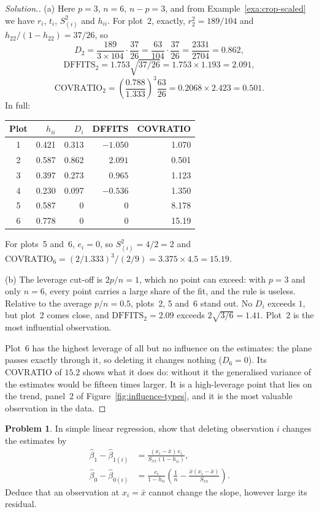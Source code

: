 \documentclass[11pt,a4paper]{article}
\numberwithin{equation}{section}
\theoremstyle{definition}
\newtheorem{problemx}{Problem}[subsection]
\newenvironment{problem}{\begin{problemx}}{\end{problemx}}
\newenvironment{solution}
  {\renewcommand{\qedsymbol}{}\begin{proof}[\textit{Solution}.]}
  {\end{proof}}
\begin{document}
\begin{solution}
(a) Here $p = 3$, $n = 6$, $n - p = 3$, and from Example~\ref{exa:crop-scaled} we have $r_i$, $t_i$,
$S^2_{(i)}$ and $h_{ii}$. For plot~2, exactly, $r_2^2 = 189/104$ and $h_{22}/(1 - h_{22}) = 37/26$, so
\[
D_2 = \frac{189}{3 \times 104}\cdot\frac{37}{26} = \frac{63}{104}\cdot\frac{37}{26} = \frac{2331}{2704} = 0.862 ,
\]
\[
\mathrm{DFFITS}_2 = 1.753\sqrt{37/26} = 1.753 \times 1.193 = 2.091 ,
\]
\[
\mathrm{COVRATIO}_2 = \left(\frac{0.788}{1.333}\right)^3\frac{63}{26} = 0.2068 \times 2.423 = 0.501 .
\]
In full:
\begin{center}
\begin{tabular}{c|rrrr}
Plot & $h_{ii}$ & $D_i$ & DFFITS & COVRATIO \\
\hline
1 & 0.421 & 0.313 & $-1.050$ & 1.070 \\
2 & 0.587 & 0.862 & $2.091$ & 0.501 \\
3 & 0.397 & 0.273 & $0.965$ & 1.123 \\
4 & 0.230 & 0.097 & $-0.536$ & 1.350 \\
5 & 0.587 & 0 & 0 & 8.178 \\
6 & 0.778 & 0 & 0 & 15.19 \\
\end{tabular}
\end{center}
For plots~5 and~6, $e_i = 0$, so $S^2_{(i)} = 4/2 = 2$ and
$\mathrm{COVRATIO}_6 = (2/1.333)^3/(2/9) = 3.375 \times 4.5 = 15.19$.

(b) The leverage cut-off is $2p/n = 1$, which no point can exceed: with $p = 3$ and only
$n = 6$, every point carries a large share of the fit, and the rule is useless. Relative to
the average $p/n = 0.5$, plots~2, 5 and~6 stand out. No $D_i$ exceeds $1$, but plot~2 comes
close, and $\mathrm{DFFITS}_2 = 2.09$ exceeds $2\sqrt{3/6} = 1.41$. Plot~2 is the most
influential observation.

Plot~6 has the highest leverage of all but no influence on the estimates: the plane passes
exactly through it, so deleting it changes nothing ($D_6 = 0$). Its COVRATIO of $15.2$ shows
what it does do: without it the generalised variance of the estimates would be fifteen times
larger. It is a high-leverage point that lies on the trend, panel~2 of
Figure~\ref{fig:influence-types}, and it is the most valuable observation in the data.
\end{solution}

\begin{problem}\label{prob:slope-change}
In simple linear regression, show that deleting observation $i$ changes the estimates by
\begin{align*}
\hat\beta_1 - \hat\beta_{1(i)} &= \frac{(x_i - \bar x)\,e_i}{S_{xx}(1 - h_{ii})} , \\
\hat\beta_0 - \hat\beta_{0(i)} &= \frac{e_i}{1 - h_{ii}}\left(\frac{1}{n} - \frac{\bar x(x_i - \bar x)}{S_{xx}}\right) .
\end{align*}
Deduce that an observation at $x_i = \bar x$ cannot change the slope, however large its
residual.
\end{problem}
\end{document}
